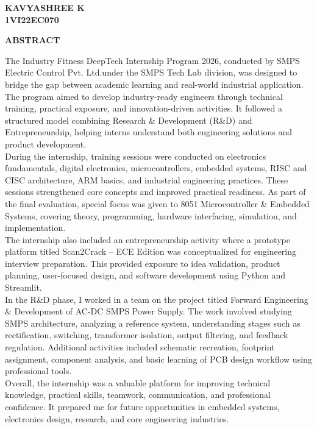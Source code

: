 \documentclass[12pt,a4paper,twocolumn,fleqn]{article}
\begin{document}
\begin{flushright}
\textbf{KAVYASHREE K} \\
\textbf{1VI22EC070}
\end{flushright}
\newpage
\begin{center}
{\Large \textbf{ABSTRACT}}\\[1cm]
\end{center}
\onehalfspacing
\noindent
The Industry Fitness DeepTech Internship Program 2026, conducted by SMPS Electric Control Pvt. Ltd.under the SMPS Tech Lab division, was designed to bridge the gap between academic learning and real-world industrial application. The program aimed to develop industry-ready engineers through technical training, practical exposure, and innovation-driven activities. It followed a structured model combining Research \& Development (R\&D) and Entrepreneurship, helping interns understand both engineering solutions and product development.\\[5mm]
\noindent
During the internship, training sessions were conducted on electronics fundamentals, digital electronics, microcontrollers, embedded systems, RISC and CISC architecture, ARM basics, and industrial engineering practices. These sessions strengthened core concepts and improved practical readiness. As part of the final evaluation, special focus was given to 8051 Microcontroller \& Embedded Systems, covering theory, programming, hardware interfacing, simulation, and implementation.  \\[5mm]
\noindent
The internship also included an entrepreneurship activity where a prototype platform titled Scan2Crack – ECE Edition was conceptualized for engineering interview preparation. This provided exposure to idea validation, product planning, user-focused design, and software development using Python and Streamlit. \\[5mm] 
\noindent
In the R\&D phase, I worked in a team on the project titled Forward Engineering \& Development of AC-DC SMPS Power Supply. The work involved studying SMPS architecture, analyzing a reference system, understanding stages such as rectification, switching, transformer isolation, output filtering, and feedback regulation. Additional activities included schematic recreation, footprint assignment, component analysis, and basic learning of PCB design workflow using professional tools. \\[5mm] 
\noindent
Overall, the internship was a valuable platform for improving technical knowledge, practical skills, teamwork, communication, and professional confidence. It prepared me for future opportunities in embedded systems, electronics design, research, and core engineering industries.
\end{document}
